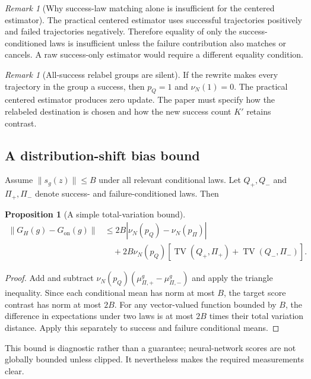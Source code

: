 \documentclass[11pt]{article}
\newcommand{\TV}{\operatorname{TV}}
\newtheorem{proposition}[theorem]{Proposition}
\theoremstyle{definition}
\theoremstyle{remark}
\newtheorem{remark}[theorem]{Remark}
\begin{document}
\begin{remark}[Why success-law matching alone is insufficient for the centered estimator]
The practical centered estimator uses successful trajectories positively and failed trajectories negatively. Therefore equality of only the success-conditioned laws is insufficient unless the failure contribution also matches or cancels. A raw success-only estimator would require a different equality condition.
\end{remark}

\begin{remark}[All-success relabel groups are silent]
If the rewrite makes every trajectory in the group a success, then $p_Q=1$ and $\nu_N(1)=0$. The practical centered estimator produces zero update. The paper must specify how the relabeled destination is chosen and how the new success count $K'$ retains contrast.
\end{remark}

\subsection{A distribution-shift bias bound}

Assume $\|s_g(z)\|\le B$ under all relevant conditional laws. Let $Q_+,Q_-$ and $\Pi_+,\Pi_-$ denote success- and failure-conditioned laws. Then
\begin{proposition}[A simple total-variation bound]
\begin{align}
\|G_H(g)-G_{\mathrm{on}}(g)\|
&\le 2B\left|\nu_N(p_Q)-\nu_N(p_\Pi)\right|\\
&\quad+2B\nu_N(p_Q)
\left[\TV(Q_+,\Pi_+)+\TV(Q_-,\Pi_-)\right].
\label{eq:tv-bound}
\end{align}
\end{proposition}

\begin{proof}
Add and subtract $\nu_N(p_Q)(\mu_{\Pi,+}^g-\mu_{\Pi,-}^g)$ and apply the triangle inequality. Since each conditional mean has norm at most $B$, the target score contrast has norm at most $2B$. For any vector-valued function bounded by $B$, the difference in expectations under two laws is at most $2B$ times their total variation distance. Apply this separately to success and failure conditional means.
\end{proof}

This bound is diagnostic rather than a guarantee; neural-network scores are not globally bounded unless clipped. It nevertheless makes the required measurements clear.
\end{document}
